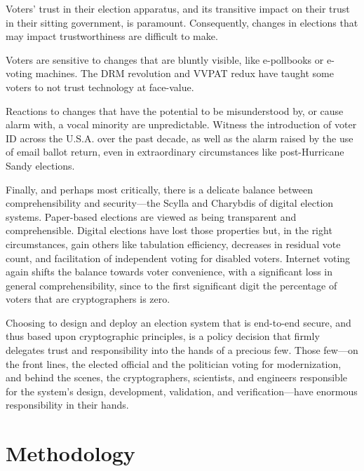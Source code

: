 Voters' trust in their election apparatus, and its transitive impact on
their trust in their sitting government, is paramount. Consequently,
changes in elections that may impact trustworthiness are difficult to
make.

Voters are sensitive to changes that are bluntly visible, like
e-pollbooks or e-voting machines. The DRM revolution and VVPAT redux
have taught some voters to not trust technology at face-value.

Reactions to changes that have the potential to be misunderstood by,
or cause alarm with, a vocal minority are unpredictable. Witness the
introduction of voter ID across the U.S.A. over the past decade, as
well as the alarm raised by the use of email ballot return, even in
extraordinary circumstances like post-Hurricane Sandy elections.

Finally, and perhaps most critically, there is a delicate balance
between comprehensibility and security---the Scylla and Charybdis of
digital election systems. Paper-based elections are viewed as being
transparent and comprehensible. Digital elections have lost those
properties but, in the right circumstances, gain others like
tabulation efficiency, decreases in residual vote count, and
facilitation of independent voting for disabled voters. Internet
voting again shifts the balance towards voter convenience, with a
significant loss in general comprehensibility, since to the first
significant digit the percentage of voters that are cryptographers is
zero.

Choosing to design and deploy an election system that is end-to-end
secure, and thus based upon cryptographic principles, is a policy
decision that firmly delegates trust and responsibility into the hands
of a precious few.  Those few---on the front lines, the elected official
and the politician voting for modernization, and behind the scenes,
the cryptographers, scientists, and engineers responsible for the
system's design, development, validation, and verification---have
enormous responsibility in their hands.

\section{Methodology}

